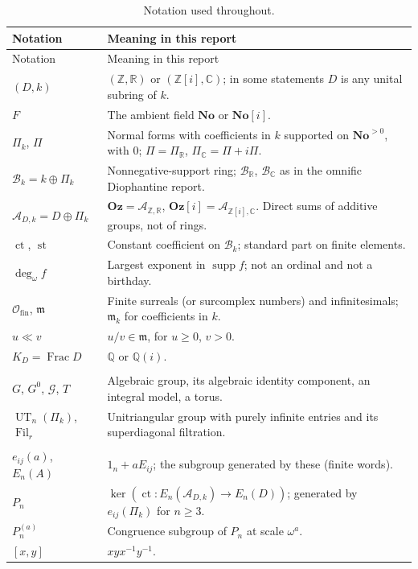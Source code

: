 \documentclass[11pt,oneside]{article}
\numberwithin{equation}{section}
\theoremstyle{definition}
\theoremstyle{remark}
\newcommand{\No}{\mathbf{No}}
\newcommand{\Oz}{\mathbf{Oz}}
\newcommand{\GOz}{\mathbf{Oz}[i]}
\newcommand{\SC}{\No[i]}
\newcommand{\Z}{\mathbb Z}
\newcommand{\Q}{\mathbb Q}
\newcommand{\R}{\mathbb R}
\newcommand{\C}{\mathbb C}
\newcommand{\A}{\mathcal A}
\newcommand{\Bk}{\mathcal B_k}
\newcommand{\BR}{\mathcal B_{\R}}
\newcommand{\BC}{\mathcal B_{\C}}
\newcommand{\cG}{\mathcal G}
\newcommand{\Ofin}{\mathcal O_{\mathrm{fin}}}
\newcommand{\mm}{\mathfrak m}
\newcommand{\ct}{\operatorname{ct}}
\newcommand{\st}{\operatorname{st}}
\newcommand{\supp}{\operatorname{supp}}
\newcommand{\ddeg}{\operatorname{deg}_{\omega}}
\newcommand{\UT}{\operatorname{UT}}
\newcommand{\Frac}{\operatorname{Frac}}
\newcommand{\Fil}{\operatorname{Fil}}
\begin{document}
{\renewcommand{\arraystretch}{1.2}
\begin{longtable}{>{\raggedright\arraybackslash}p{}>{\raggedright\arraybackslash}p{}}
\caption{Notation used throughout.}\label{ogl:tab:notation}\\
\toprule
Notation & Meaning in this report\\
\midrule
\endfirsthead
\toprule
Notation & Meaning in this report\\
\midrule
\endhead
$(D,k)$ & $(\Z,\R)$ or $(\Z[i],\C)$; in some statements $D$ is any unital subring of $k$.\\
$F$ & The ambient field $\No$ or $\SC$.\\
$\Pi_k$, $\Pi$ & Normal forms with coefficients in $k$ supported on $\No^{>0}$, with $0$; $\Pi=\Pi_\R$, $\Pi_\C=\Pi+i\Pi$.\\
$\Bk=k\oplus\Pi_k$ & Nonnegative-support ring; $\BR$, $\BC$ as in the omnific Diophantine report.\\
$\A_{D,k}=D\oplus\Pi_k$ & $\Oz=\A_{\Z,\R}$, $\GOz=\A_{\Z[i],\C}$. Direct sums of additive groups, not of rings.\\
$\ct$, $\st$ & Constant coefficient on $\Bk$; standard part on finite elements.\\
$\ddeg f$ & Largest exponent in $\supp f$; not an ordinal and not a birthday.\\
$\Ofin$, $\mm$ & Finite surreals (or surcomplex numbers) and infinitesimals; $\mm_k$ for coefficients in $k$.\\
$u\ll v$ & $u/v\in\mm$, for $u\ge0$, $v>0$.\\
$K_D=\Frac D$ & $\Q$ or $\Q(i)$.\\
\multicolumn{2}{@{}l}{\emph{Part I}}\\
$G$, $G^0$, $\cG$, $T$ & Algebraic group, its algebraic identity component, an integral model, a torus.\\
$\UT_n(\Pi_k)$, $\Fil_r$ & Unitriangular group with purely infinite entries and its superdiagonal filtration.\\
\multicolumn{2}{@{}l}{\emph{Part II}}\\
$e_{ij}(a)$, $E_n(A)$ & $1_n+aE_{ij}$; the subgroup generated by these (finite words).\\
$P_n$ & $\ker(\ct:E_n(\A_{D,k})\to E_n(D))$; generated by $e_{ij}(\Pi_k)$ for $n\ge3$.\\
$P_n^{(a)}$ & Congruence subgroup of $P_n$ at scale $\omega^a$.\\
$[x,y]$ & $xyx^{-1}y^{-1}$.\\

\end{longtable}}
\end{document}
